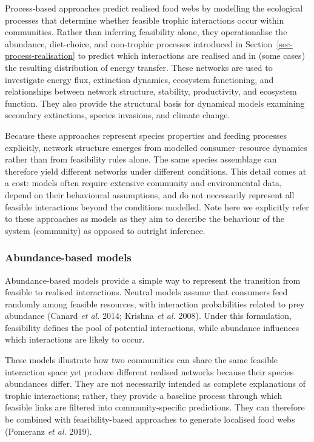 \documentclass[
]{article}
\begin{document}
Process-based approaches predict realised food webs by modelling the
ecological processes that determine whether feasible trophic
interactions occur within communities. Rather than inferring feasibility
alone, they operationalise the abundance, diet-choice, and non-trophic
processes introduced in Section~\ref{sec-process-realisation} to predict
which interactions are realised and in (some cases) the resulting
distribution of energy transfer. These networks are used to investigate
energy flux, extinction dynamics, ecosystem functioning, and
relationships between network structure, stability, productivity, and
ecosystem function. They also provide the structural basis for dynamical
models examining secondary extinctions, species invasions, and climate
change.

Because these approaches represent species properties and feeding
processes explicitly, network structure emerges from modelled
consumer--resource dynamics rather than from feasibility rules alone.
The same species assemblage can therefore yield different networks under
different conditions. This detail comes at a cost: models often require
extensive community and environmental data, depend on their behavioural
assumptions, and do not necessarily represent all feasible interactions
beyond the conditions modelled. Note here we explicitly refer to these
approaches as models as they aim to describe the behaviour of the system
(community) as opposed to outright inference.

\subsubsection{Abundance-based models}\label{abundance-based-models}

Abundance-based models provide a simple way to represent the transition
from feasible to realised interactions. Neutral models assume that
consumers feed randomly among feasible resources, with interaction
probabilities related to prey abundance (Canard \emph{et al.} 2014;
Krishna \emph{et al.} 2008). Under this formulation, feasibility defines
the pool of potential interactions, while abundance influences which
interactions are likely to occur.

These models illustrate how two communities can share the same feasible
interaction space yet produce different realised networks because their
species abundances differ. They are not necessarily intended as complete
explanations of trophic interactions; rather, they provide a baseline
process through which feasible links are filtered into
community-specific predictions. They can therefore be combined with
feasibility-based approaches to generate localised food webs (Pomeranz
\emph{et al.} 2019).
\end{document}
